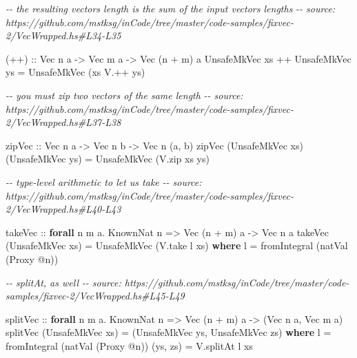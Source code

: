 \documentclass[]{article}
\newenvironment{Shaded}{}{}
\newcommand{\CommentTok}[1]{\textcolor[rgb]{0.38,0.63,0.69}{\textit{#1}}}
\newcommand{\DataTypeTok}[1]{\textcolor[rgb]{0.56,0.13,0.00}{#1}}
\newcommand{\FunctionTok}[1]{\textcolor[rgb]{0.02,0.16,0.49}{#1}}
\newcommand{\KeywordTok}[1]{\textcolor[rgb]{0.00,0.44,0.13}{\textbf{#1}}}
\newcommand{\NormalTok}[1]{#1}
\newcommand{\OperatorTok}[1]{\textcolor[rgb]{0.40,0.40,0.40}{#1}}
\newcommand{\OtherTok}[1]{\textcolor[rgb]{0.00,0.44,0.13}{#1}}
\begin{document}
\begin{Shaded}
\begin{Highlighting}[]
\CommentTok{{-}{-} the resulting vector\textquotesingle{}s length is the sum of the input vectors\textquotesingle{} lengths}
\CommentTok{{-}{-} source: https://github.com/mstksg/inCode/tree/master/code{-}samples/fixvec{-}2/VecWrapped.hs\#L34{-}L35}

\OtherTok{(++) ::} \DataTypeTok{Vec}\NormalTok{ n a }\OtherTok{{-}\textgreater{}} \DataTypeTok{Vec}\NormalTok{ m a }\OtherTok{{-}\textgreater{}} \DataTypeTok{Vec}\NormalTok{ (n }\OperatorTok{+}\NormalTok{ m) a}
\DataTypeTok{UnsafeMkVec}\NormalTok{ xs }\OperatorTok{++} \DataTypeTok{UnsafeMkVec}\NormalTok{ ys }\OtherTok{=} \DataTypeTok{UnsafeMkVec}\NormalTok{ (xs }\OperatorTok{V.++}\NormalTok{ ys)}

\CommentTok{{-}{-} you must zip two vectors of the same length}
\CommentTok{{-}{-} source: https://github.com/mstksg/inCode/tree/master/code{-}samples/fixvec{-}2/VecWrapped.hs\#L37{-}L38}

\OtherTok{zipVec ::} \DataTypeTok{Vec}\NormalTok{ n a }\OtherTok{{-}\textgreater{}} \DataTypeTok{Vec}\NormalTok{ n b }\OtherTok{{-}\textgreater{}} \DataTypeTok{Vec}\NormalTok{ n (a, b)}
\NormalTok{zipVec (}\DataTypeTok{UnsafeMkVec}\NormalTok{ xs) (}\DataTypeTok{UnsafeMkVec}\NormalTok{ ys) }\OtherTok{=} \DataTypeTok{UnsafeMkVec}\NormalTok{ (V.zip xs ys)}

\CommentTok{{-}{-} type{-}level arithmetic to let us \textquotesingle{}take\textquotesingle{}}
\CommentTok{{-}{-} source: https://github.com/mstksg/inCode/tree/master/code{-}samples/fixvec{-}2/VecWrapped.hs\#L40{-}L43}

\OtherTok{takeVec ::} \KeywordTok{forall}\NormalTok{ n m a}\OperatorTok{.} \DataTypeTok{KnownNat}\NormalTok{ n }\OtherTok{=\textgreater{}} \DataTypeTok{Vec}\NormalTok{ (n }\OperatorTok{+}\NormalTok{ m) a }\OtherTok{{-}\textgreater{}} \DataTypeTok{Vec}\NormalTok{ n a}
\NormalTok{takeVec (}\DataTypeTok{UnsafeMkVec}\NormalTok{ xs) }\OtherTok{=} \DataTypeTok{UnsafeMkVec}\NormalTok{ (V.take l xs)}
  \KeywordTok{where}
\NormalTok{    l }\OtherTok{=} \FunctionTok{fromIntegral}\NormalTok{ (natVal (}\DataTypeTok{Proxy} \OperatorTok{@}\NormalTok{n))}

\CommentTok{{-}{-} splitAt, as well}
\CommentTok{{-}{-} source: https://github.com/mstksg/inCode/tree/master/code{-}samples/fixvec{-}2/VecWrapped.hs\#L45{-}L49}

\OtherTok{splitVec ::} \KeywordTok{forall}\NormalTok{ n m a}\OperatorTok{.} \DataTypeTok{KnownNat}\NormalTok{ n }\OtherTok{=\textgreater{}} \DataTypeTok{Vec}\NormalTok{ (n }\OperatorTok{+}\NormalTok{ m) a }\OtherTok{{-}\textgreater{}}\NormalTok{ (}\DataTypeTok{Vec}\NormalTok{ n a, }\DataTypeTok{Vec}\NormalTok{ m a)}
\NormalTok{splitVec (}\DataTypeTok{UnsafeMkVec}\NormalTok{ xs) }\OtherTok{=}\NormalTok{ (}\DataTypeTok{UnsafeMkVec}\NormalTok{ ys, }\DataTypeTok{UnsafeMkVec}\NormalTok{ zs)}
  \KeywordTok{where}
\NormalTok{    l }\OtherTok{=} \FunctionTok{fromIntegral}\NormalTok{ (natVal (}\DataTypeTok{Proxy} \OperatorTok{@}\NormalTok{n))}
\NormalTok{    (ys, zs) }\OtherTok{=}\NormalTok{ V.splitAt l xs}
\end{Highlighting}
\end{Shaded}
\end{document}
